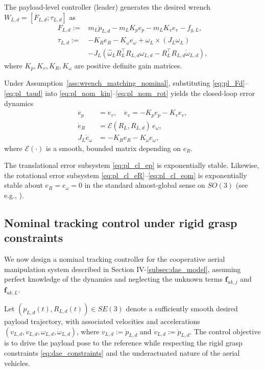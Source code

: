 \documentclass[letterpaper, 10 pt, conference]{ieeeconf}  %
\newcommand{\0}{\matr{0}}
\begin{document}
The payload-level controller (leader) generates the desired wrench $W_{L,d}=[F_{L,d};\tau_{L,d}]$ as
\begin{align}
F_{L,d} :=& m_L\ddot p_{L,d} - m_L K_p e_p - m_L K_v e_v - f_{g,L},
\label{eq:pl_Fd}\\
\tau_{L,d} := &-K_R e_R - K_\omega e_\omega
+ \omega_L\times(J_L\omega_L)\nonumber\\
&- J_L\!\left(\hat\omega_L R_L^\top R_{L,d}\omega_{L,d}
- R_L^\top R_{L,d}\dot\omega_{L,d}\right),
\label{eq:pl_taud}
\end{align}
where $K_p,K_v,K_R,K_\omega$ are positive definite gain matrices.

Under Assumption~\ref{ass:wrench_matching_nominal}, substituting
\eqref{eq:pl_Fd}--\eqref{eq:pl_taud} into \eqref{eq:pl_nom_kin}--\eqref{eq:pl_nom_rot}
yields the closed-loop error dynamics
\begin{align}
\dot e_p &= e_v, \quad \dot e_v = -K_p e_p - K_v e_v, \label{eq:pl_cl_ep}\\
\dot e_R &= \mathcal{E}(R_L,R_{L,d})\,e_\omega, \label{eq:pl_cl_eR}\\
J_L\dot e_\omega &= -K_R e_R - K_\omega e_\omega,
\label{eq:pl_cl_eom}
\end{align}
where $\mathcal{E}(\cdot)$ is a smooth, bounded matrix depending on $e_R$.

The translational error subsystem \eqref{eq:pl_cl_ep} 
is exponentially stable.
Likewise, the rotational error subsystem
\eqref{eq:pl_cl_eR}--\eqref{eq:pl_cl_eom} is exponentially stable about
$e_R=e_\omega=0$ in the standard almost-global sense on $SO(3)$ (see e.g., \cite{lee2010geometric}).

\subsection{Nominal tracking control under rigid grasp constraints}
\label{subsec:tracking_nominal}

We now design a nominal tracking controller for the cooperative aerial manipulation
system described in Section IV-\ref{subsec:dae_model}, assuming perfect knowledge of the
dynamics and neglecting the unknown terms $\mathbf f_{uk,j}$ and $\mathbf f_{uk,L}$.

Let $(p_{L,d}(t),R_{L,d}(t))\in SE(3)$ denote a sufficiently smooth desired payload
trajectory, with associated velocities and accelerations
$(v_{L,d},\dot v_{L,d},\omega_{L,d},\dot\omega_{L,d})$, where
$v_{L,d}:=\dot p_{L,d}$ and $\dot v_{L,d}:=\ddot p_{L,d}$.
The control objective is to drive the payload pose to the reference while respecting
the rigid grasp constraints \eqref{eq:dae_constraints} and the underactuated nature
of the aerial vehicles.
\end{document}
